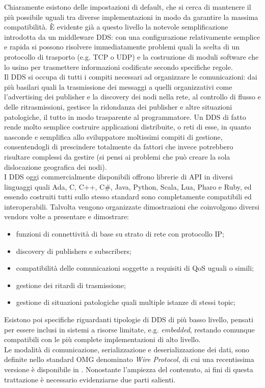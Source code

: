 Chiaramente esistono delle impostazioni di default, che si cerca di mantenere il più possibile uguali tra diverse implementazioni in modo da garantire la massima compatibilità.\newpage
È evidente già a questo livello la notevole semplificazione introdotta da un middleware DDS: con una configurazione relativamente semplice e rapida si possono risolvere immediatamente problemi quali la scelta di un protocollo di trasporto (e.g. TCP o UDP) e la costruzione di moduli software che lo usino per trasmettere informazioni codificate secondo specifiche regole.\\
Il DDS si occupa di tutti i compiti necessari ad organizzare le comunicazioni: dai più basilari quali la trasmissione dei messaggi a quelli organizzativi come l’advertising dei publisher e la discovery dei nodi nella rete, al controllo di flusso e delle ritrasmissioni, gestisce la ridondanza dei publisher e altre situazioni patologiche, il tutto in modo trasparente al programmatore. Un DDS di fatto rende molto semplice costruire applicazioni distribuite, o reti di esse, in quanto nasconde e semplifica allo sviluppatore moltissimi compiti di gestione, consentendogli di prescindere totalmente da fattori che invece potrebbero risultare complessi da gestire (si pensi ai problemi che può creare la sola dislocazione geografica dei nodi).\\
I DDS oggi commercialmente disponibili offrono librerie di API in diversi linguaggi quali  Ada, C, C++, C\#, Java, Python, Scala, Lua, Pharo e Ruby, ed essendo costruiti tutti sullo stesso standard sono completamente compatibili ed interoperabili. Talvolta vengono organizzate dimostrazioni che coinvolgono diversi vendors volte a presentare e dimostrare:
\begin{itemize}
    \item funzioni di connettività di base su strato di rete con protocollo IP;
    \item discovery di publishers e subscribers;
    \item compatibilità delle comunicazioni soggette a requisiti di QoS uguali o simili;
    \item gestione dei ritardi di trasmissione;
    \item gestione di situazioni patologiche quali multiple istanze di stessi topic;
\end{itemize}
Esistono poi specifiche riguardanti tipologie di DDS di più basso livello, pensati per essere inclusi in sistemi a risorse limitate, e.g. \emph{embedded}, restando comunque compatibili con le più complete implementazioni di alto livello.\\
Le modalità di comunicazione, serializzazione e deserializzazione dei dati, sono definite nello standard OMG denominato \emph{Wire Protocol}, di cui una recentissima versione è disponibile in \cite{wire}. Nonostante l'ampiezza del contenuto, ai fini di questa trattazione è necessario evidenziarne due parti salienti.

